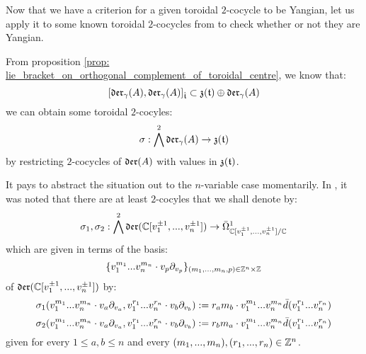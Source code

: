         Now that we have a criterion for a given toroidal $2$-cocycle to be Yangian, let us apply it to some known toroidal $2$-cocycles from \cite{billig_energy_momentum_tensor} to check whether or not they are Yangian. 
        \begin{example} \label{example: yangian_cocycles_(counter)_examples}
            From proposition \ref{prop: lie_bracket_on_orthogonal_complement_of_toroidal_centre}, we know that:
                $$[\mathfrak{der}_{\gamma}(A), \mathfrak{der}_{\gamma}(A)]_{\hat{\mathfrak{t}}} \subset \mathfrak{z}(\mathfrak{t}) \oplus \mathfrak{der}_{\gamma}(A)$$
            we can obtain some toroidal $2$-cocyles:
                $$\sigma: \bigwedge^2 \mathfrak{der}_{\gamma}(A) \to \mathfrak{z}(\mathfrak{t})$$
            by restricting $2$-cocycles of $\mathfrak{der}(A)$ with values in $\mathfrak{z}(\mathfrak{t})$.

            It pays to abstract the situation out to the $n$-variable case momentarily. In \cite[p. 5, below Equation 1.3]{billig_energy_momentum_tensor}, it was noted that there are at least $2$-cocyles that we shall denote by:
                $$\sigma_1, \sigma_2: \bigwedge^2 \mathfrak{der}(\mathbb{C}[v_1^{\pm 1}, ..., v_n^{\pm 1}]) \to \bar{\Omega}^1_{\mathbb{C}[v_1^{\pm 1}, ..., v_n^{\pm 1}]/\mathbb{C}}$$
            which are given in terms of the basis:
                $$\{ v_1^{m_1} ... v_n^{m_n} \cdot v_p \del_{v_p} \}_{(m_1, ..., m_n, p) \in \Z^n \x \Z}$$
            of $\mathfrak{der}(\mathbb{C}[v_1^{\pm 1}, ..., v_n^{\pm 1}])$ by:
                $$\sigma_1(v_1^{m_1} ... v_n^{m_n} \cdot v_a \partial_{v_a}, v_1^{r_1} ... v_n^{r_n} \cdot v_b \partial_{v_b}) := r_a m_b \cdot v_1^{m_1} ... v_n^{m_n} \bar{d}( v_1^{r_1} ... v_n^{r_n} )$$
                $$\sigma_2(v_1^{m_1} ... v_n^{m_n} \cdot v_a \partial_{v_a}, v_1^{r_1} ... v_n^{r_n} \cdot v_b \partial_{v_b}) := r_b m_a \cdot v_1^{m_1} ... v_n^{m_n} \bar{d}( v_1^{r_1} ... v_n^{r_n} )$$
            given for every $1 \leq a, b \leq n$ and every $(m_1, ..., m_n), (r_1, ..., r_n) \in \mathbb{Z}^n$. 


\end{example}
